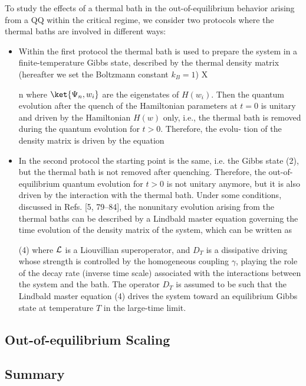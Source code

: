 To study the effects of a thermal bath in the out-of-equilibrium
behavior arising from a QQ within the critical regime,
we consider two protocols where the thermal
baths are involved in different ways:
\begin{itemize}
	\item
		Within the first protocol the thermal bath is used to
		prepare the system in a finite-temperature Gibbs state,
		described by the thermal density matrix (hereafter we set
		the Boltzmann constant $k_B = 1$)
X

n
		where $\ket{\Psi_n, w_i}$ are the eigenstates of $H(w_i )$. Then the
		quantum evolution after the quench of the Hamiltonian
		parameters at $t = 0$ is unitary and driven by the Hamiltonian $H(w)$
		only, i.e., the thermal bath is removed during
		the quantum evolution for $t > 0$. Therefore, the evolu-
		tion of the density matrix is driven by the equation
\item In the second protocol the starting point is the
same, i.e. the Gibbs state (2), but the thermal bath
is not removed after quenching. Therefore, the out-of-equilibrium 
quantum evolution for $t > 0$ is not unitary
anymore, but it is also driven by the interaction with
the thermal bath. Under some conditions, discussed in
Refs. [5, 79–84], the nonunitary evolution arising from
the thermal baths can be described by a Lindbald master
equation governing the time evolution of the density
matrix of the system, which can be written as


(4)
where ${\cal L}$ is a Liouvillian superoperator, and $D_T$ is a dissipative
driving whose strength is controlled by the homogeneous
coupling $\gamma$, playing the role of the decay rate
(inverse time scale) associated with the interactions between
the system and the bath. The operator $D_T$ is assumed
to be such that the Lindbald master equation (4)
drives the system toward an equilibrium Gibbs state at
temperature $T$ in the large-time limit.
\end{itemize}

\subsection{Out-of-equilibrium Scaling}


\subsection{Summary}

